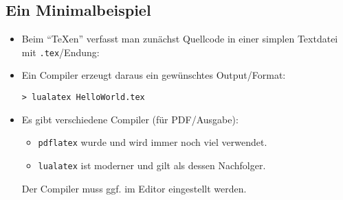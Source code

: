 \subsection{Ein Minimalbeispiel}

\begin{frame}{\subsecname}
    \begin{itemize}
        \item Beim \enquote{\TeX{}en} verfasst man zunächst \alert{Quellcode} in einer simplen
            Textdatei mit \texttt{.tex}\-/Endung:
        \item Ein \alert{Compiler} erzeugt daraus ein gewünschtes Output\-/Format:
            \begin{center}
                \texttt{> lualatex HelloWorld.tex}
            \end{center}
        \item Es gibt verschiedene Compiler (für PDF\-/Ausgabe):
            \begin{itemize}
                \item \alert{\texttt{pdflatex}} wurde und wird immer noch viel verwendet.
                \item \alert{\texttt{lualatex}} ist moderner und gilt als dessen Nachfolger.
            \end{itemize}
            Der Compiler muss ggf. im Editor eingestellt werden.
    \end{itemize}
\end{frame}
